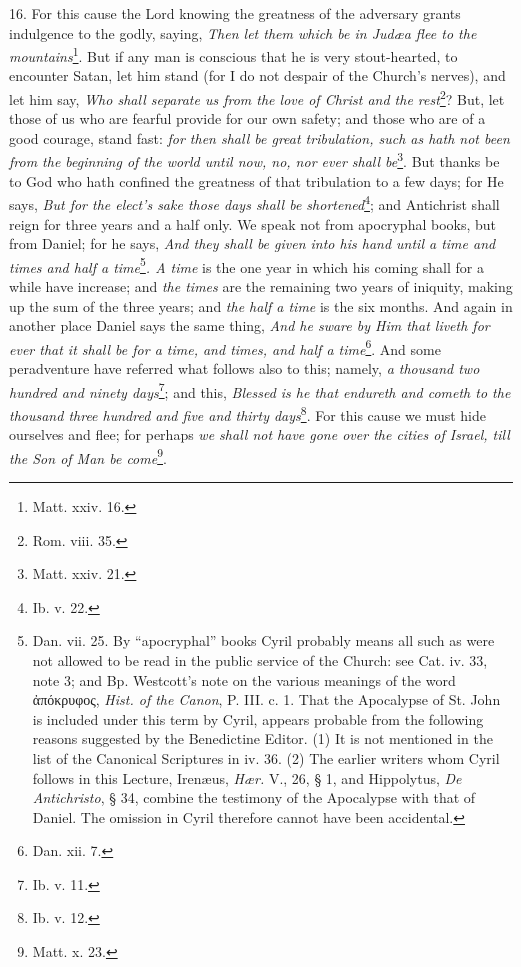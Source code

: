 16. For this cause the Lord knowing the greatness of the adversary grants indulgence to the godly, saying, \emph{Then let them which be in Judæa flee to the mountains}\footnote{Matt. xxiv. 16.}. But if any man is conscious that he is very stout-hearted, to encounter Satan, let him stand (for I do not despair of the Church’s nerves), and let him say, \emph{Who shall separate us from the love of Christ and the rest}\footnote{Rom. viii. 35.}? But, let those of us who are fearful provide for our own safety; and those who are of a good courage, stand fast: \emph{for then shall be great tribulation, such as hath not been from the beginning of the world until now, no, nor ever shall be}\footnote{Matt. xxiv. 21.}. But thanks be to God who hath confined the greatness of that tribulation to a few days; for He says, \emph{But for the elect’s sake those days shall be shortened}\footnote{Ib. v. 22.}; and Antichrist shall reign for three years and a half only. We speak not from apocryphal books, but from Daniel; for he says, \emph{And they shall be given into his hand until a time and times and half a time}\footnote{Dan. vii. 25. By “apocryphal” books Cyril probably means all such as were not allowed to be read in the public service of the Church: see Cat. iv. 33, note 3; and Bp. Westcott’s note on the various meanings of the word \textgreek{ἀπόκρυφος}, \emph{Hist. of the Canon}, P. III. c. 1. That the Apocalypse of St. John is included under this term by Cyril, appears probable from the following reasons suggested by the Benedictine Editor. (1) It is not mentioned in the list of the Canonical Scriptures in iv. 36. (2) The earlier writers whom Cyril follows in this Lecture, Irenæus, \emph{Hær.} V., 26, § 1, and Hippolytus, \emph{De Antichristo}, § 34, combine the testimony of the Apocalypse with that of Daniel. The omission in Cyril therefore cannot have been accidental.}\emph{. A time} is the one year in which his coming shall for a while have increase; and \emph{the times} are the remaining two years of iniquity, making up the sum of the three years; and \emph{the half a time} is the six months. And again in another place Daniel says the same thing, \emph{And he sware by Him that liveth for ever that it shall be for a time, and times, and half a time}\footnote{Dan. xii. 7.}. And some peradventure have referred what follows also to this; namely, \emph{a thousand two hundred and ninety days}\footnote{Ib. v. 11.}; and this, \emph{Blessed is he that endureth and cometh to the thousand three hundred and five and thirty days}\footnote{Ib. v. 12.}. For this cause we must hide ourselves and flee; for perhaps \emph{we shall not have gone over the cities of Israel, till the Son of Man be come}\footnote{Matt. x. 23.}.

